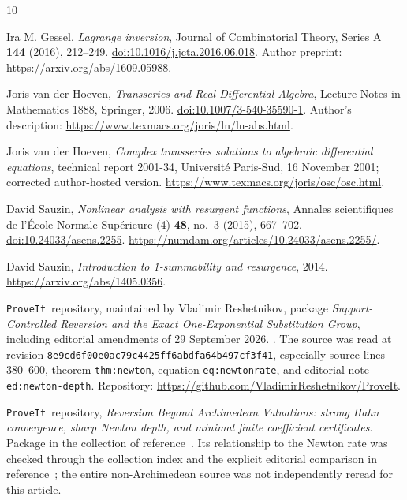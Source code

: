 \documentclass[11pt,a4paper]{article}
\theoremstyle{definition}
\theoremstyle{remark}
\newcommand{\repo}{\texttt{ProveIt}}
\numberwithin{equation}{section}
\begin{document}
\begin{thebibliography}{10}
\raggedright
{}
Ira M. Gessel, \emph{Lagrange inversion}, Journal of Combinatorial Theory, Series A \textbf{144} (2016), 212--249.
\href{https://doi.org/10.1016/j.jcta.2016.06.018}{doi:10.1016/j.jcta.2016.06.018}.
Author preprint: \url{https://arxiv.org/abs/1609.05988}.

Joris van der Hoeven, \emph{Transseries and Real Differential Algebra}, Lecture Notes in Mathematics 1888, Springer, 2006.
\href{https://doi.org/10.1007/3-540-35590-1}{doi:10.1007/3-540-35590-1}.
Author's description: \url{https://www.texmacs.org/joris/ln/ln-abs.html}.

Joris van der Hoeven, \emph{Complex transseries solutions to algebraic differential equations}, technical report 2001-34, Universit\'e Paris-Sud, 16 November 2001; corrected author-hosted version.
\url{https://www.texmacs.org/joris/osc/osc.html}.

David Sauzin, \emph{Nonlinear analysis with resurgent functions}, Annales scientifiques de l'\'Ecole Normale Sup\'erieure (4) \textbf{48}, no.~3 (2015), 667--702.
\href{https://doi.org/10.24033/asens.2255}{doi:10.24033/asens.2255}.
\url{https://numdam.org/articles/10.24033/asens.2255/}.

David Sauzin, \emph{Introduction to 1-summability and resurgence}, 2014.
\url{https://arxiv.org/abs/1405.0356}.

\repo\ repository, maintained by Vladimir Reshetnikov, package
\emph{Support-Controlled Reversion and the Exact One-Exponential Substitution Group}, including editorial amendments of 29 September 2026.
.
The source was read at revision \texttt{8e9cd6f00e0ac79c4425ff6abdfa64b497cf3f41}, especially source lines 380--600, theorem \texttt{thm:newton}, equation \texttt{eq:newtonrate}, and editorial note \texttt{ed:newton-depth}.
Repository: \url{https://github.com/VladimirReshetnikov/ProveIt}.

\repo\ repository, \emph{Reversion Beyond Archimedean Valuations: strong Hahn convergence, sharp Newton depth, and minimal finite coefficient certificates}.
Package  in the collection of reference~\cite{RepoIndex}. Its relationship to the Newton rate was checked through the collection index and the explicit editorial comparison in reference~\cite{RepoSupport}; the entire non-Archimedean source was not independently reread for this article.


\end{thebibliography}
\end{document}

